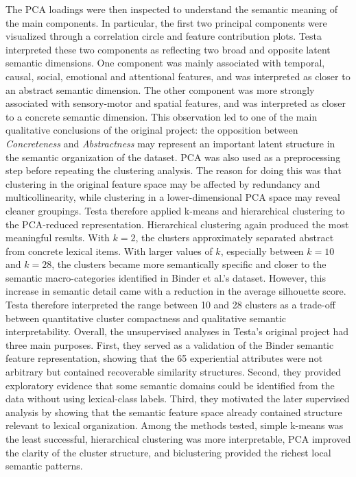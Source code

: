 \documentclass{ipgpmaster}
\begin{document}
The PCA loadings were then inspected to understand the semantic meaning of the main components. In particular, the first two principal components were visualized through a correlation circle and feature contribution plots. Testa interpreted these two components as reflecting two broad and opposite latent semantic dimensions. One component was mainly associated with temporal, causal, social, emotional and attentional features, and was interpreted as closer to an abstract semantic dimension. The other component was more strongly associated with sensory-motor and spatial features, and was interpreted as closer to a concrete semantic dimension. This observation led to one of the main qualitative conclusions of the original project: the opposition between \emph{Concreteness} and \emph{Abstractness} may represent an important latent structure in the semantic organization of the dataset.
PCA was also used as a preprocessing step before repeating the clustering analysis. The reason for doing this was that clustering in the original feature space may be affected by redundancy and multicollinearity, while clustering in a lower-dimensional PCA space may reveal cleaner groupings. Testa therefore applied k-means and hierarchical clustering to the PCA-reduced representation. Hierarchical clustering again produced the most meaningful results. With \(k = 2\), the clusters approximately separated abstract from concrete lexical items. With larger values of \(k\), especially between \(k = 10\) and \(k = 28\), the clusters became more semantically specific and closer to the semantic macro-categories identified in Binder et al.'s dataset. However, this increase in semantic detail came with a reduction in the average silhouette score. Testa therefore interpreted the range between 10 and 28 clusters as a trade-off between quantitative cluster compactness and qualitative semantic interpretability.
Overall, the unsupervised analyses in Testa's original project had three main purposes. First, they served as a validation of the Binder semantic feature representation, showing that the 65 experiential attributes were not arbitrary but contained recoverable similarity structures. Second, they provided exploratory evidence that some semantic domains could be identified from the data without using lexical-class labels. Third, they motivated the later supervised analysis by showing that the semantic feature space already contained structure relevant to lexical organization. Among the methods tested, simple k-means was the least successful, hierarchical clustering was more interpretable, PCA improved the clarity of the cluster structure, and biclustering provided the richest local semantic patterns.
\end{document}
